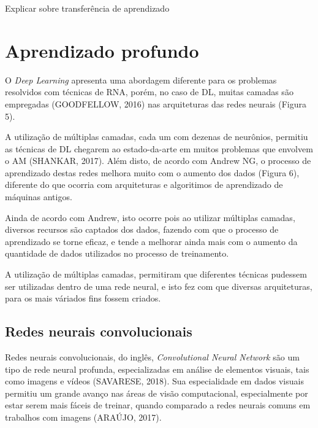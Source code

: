 \par Explicar sobre transferência de aprendizado

\section{Aprendizado profundo}

O \textit{Deep Learning} apresenta uma abordagem diferente para os problemas resolvidos com técnicas de RNA, porém, no caso de DL, muitas camadas são empregadas (GOODFELLOW, 2016) nas arquiteturas das redes neurais (Figura 5).


A utilização de múltiplas camadas, cada um com dezenas de neurônios, permitiu as técnicas de DL chegarem ao estado-da-arte em muitos problemas que envolvem o AM (SHANKAR, 2017).  Além disto, de acordo com Andrew NG, o processo de aprendizado destas redes melhora muito com o aumento dos dados (Figura 6), diferente do que ocorria com arquiteturas e algoritimos de aprendizado de máquinas antigos.


Ainda de acordo com Andrew, isto ocorre pois ao utilizar múltiplas camadas, diversos recursos são captados dos dados, fazendo com que o processo de aprendizado se torne eficaz, e tende a melhorar ainda mais com o aumento da quantidade de dados utilizados no processo de treinamento. 

A utilização de múltiplas camadas, permitiram que diferentes técnicas pudessem ser utilizadas dentro de uma rede neural, e isto fez com que diversas arquiteturas, para os mais váriados fins fossem criados.

\subsection{Redes neurais convolucionais}

Redes neurais convolucionais, do inglês, \textit{Convolutional Neural Network} são um tipo de rede neural profunda, especializadas em análise de elementos visuais, tais como imagens e vídeos (SAVARESE, 2018).  Sua especialidade em dados visuais permitiu um grande avanço nas áreas de visão computacional, especialmente por estar serem mais fáceis de treinar, quando comparado a redes neurais comuns em trabalhos com imagens (ARAÚJO, 2017).

